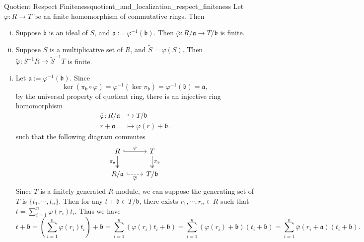 \begin{proposition}{Quotient Respect Finiteness}{quotient_and_localization_respect_finiteness}
    Let $\varphi:R\to T$ be an finite homomorphism of commutative rings. Then 
    \begin{enumerate}[(i)]
        \item Suppose $\mathfrak{b}$ is an ideal of $S$, and $\mathfrak{a}:=\varphi^{-1}(\mathfrak{b})$. Then $\overline{\varphi}:R/\mathfrak{a}\to T/\mathfrak{b}$ is finite.
        \item Suppose $S$ is a multiplicative set of $R$, and $\widetilde{S}=\varphi(S)$. Then $\widetilde{\varphi}:S^{-1}R\to \widetilde{S}^{-1}T$ is finite.
    \end{enumerate}
\end{proposition}
\begin{prf}
    \begin{enumerate}[(i)]
        \item Let $\mathfrak{a}:=\varphi^{-1}(\mathfrak{b})$. Since 
    \[
    \ker (\pi_{\mathfrak{b}}\circ \varphi )= \varphi^{-1}\left(\ker \pi_{\mathfrak{b}}\right)=\varphi^{-1}\left(\mathfrak{b}\right)=\mathfrak{a},
    \]
    by the universal property of quotient ring, there is an injective ring homomorphism 
    \begin{align*}
        \overline{\varphi}:R/\mathfrak{a}&\hookrightarrow T/\mathfrak{b}\\
        r+\mathfrak{a}&\longmapsto \varphi(r)+\mathfrak{b}.
    \end{align*}
     such that the following diagram commutes
    \[
        \begin{tikzcd}
            R \arrow[r, "\varphi", hook] \arrow[d, "\pi_{\mathfrak{a}}"', two heads] & T \arrow[d, "\pi_{\mathfrak{b}}", two heads] \\
            R/\mathfrak{a} \arrow[r, "\overline{\varphi}"', dashed, hook]                & T/\mathfrak{b}             
            \end{tikzcd}
    \]
    Since $T$ is a finitely generated $R$-module, we can suppose the generating set of $T$ is $\{t_1,\cdots,t_n\}$. Then for any $t+\mathfrak{b}\in T/\mathfrak{b}$, there exists $r_1,\cdots,r_n\in R$ such that $t=\sum_{i=1}^n \varphi(r_i)t_i$. Thus we have
    \[
    t+\mathfrak{b}=\left(\sum_{i=1}^n \varphi(r_i)t_i\right)+\mathfrak{b}
    =\sum_{i=1}^n \left(\varphi(r_i)t_i+\mathfrak{b}\right)=\sum_{i=1}^n (\varphi(r_i)+\mathfrak{b})\left(t_i+\mathfrak{b}\right)=\sum_{i=1}^n \overline{\varphi}(r_i+\mathfrak{a})\left(t_i+\mathfrak{b}\right).
\]
\end{enumerate}
\end{prf}
